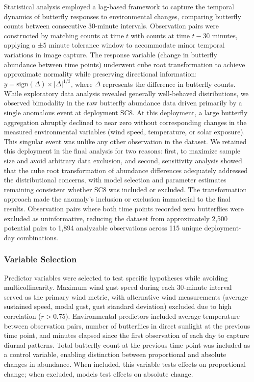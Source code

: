 Statistical analysis employed a lag-based framework to capture the temporal dynamics of butterfly responses to environmental changes, comparing butterfly counts between consecutive 30-minute intervals. Observation pairs were constructed by matching counts at time $t$ with counts at time $t-30$ minutes, applying a ±5 minute tolerance window to accommodate minor temporal variations in image capture. The response variable (change in butterfly abundance between time points) underwent cube root transformation to achieve approximate normality while preserving directional information: $y = \text{sign}(\Delta) \times |\Delta|^{1/3}$, where $\Delta$ represents the difference in butterfly counts. While exploratory data analysis revealed generally well-behaved distributions, we observed bimodality in the raw butterfly abundance data driven primarily by a single anomalous event at deployment SC8. At this deployment, a large butterfly aggregation abruptly declined to near zero without corresponding changes in the measured environmental variables (wind speed, temperature, or solar exposure). This singular event was unlike any other observation in the dataset. We retained this deployment in the final analysis for two reasons: first, to maximize sample size and avoid arbitrary data exclusion, and second, sensitivity analysis showed that the cube root transformation of abundance differences adequately addressed the distributional concerns, with model selection and parameter estimates remaining consistent whether SC8 was included or excluded. The transformation approach made the anomaly's inclusion or exclusion immaterial to the final results. Observation pairs where both time points recorded zero butterflies were excluded as uninformative, reducing the dataset from approximately 2,500 potential pairs to 1,894 analyzable observations across 115 unique deployment-day combinations.

\subsubsection{Variable Selection}

Predictor variables were selected to test specific hypotheses while avoiding multicollinearity. Maximum wind gust speed during each 30-minute interval served as the primary wind metric, with alternative wind measurements (average sustained speed, modal gust, gust standard deviation) excluded due to high correlation ($r > 0.75$). Environmental predictors included average temperature between observation pairs, number of butterflies in direct sunlight at the previous time point, and minutes elapsed since the first observation of each day to capture diurnal patterns. Total butterfly count at the previous time point was included as a control variable, enabling distinction between proportional and absolute changes in abundance. When included, this variable tests effects on proportional change; when excluded, models test effects on absolute change.

